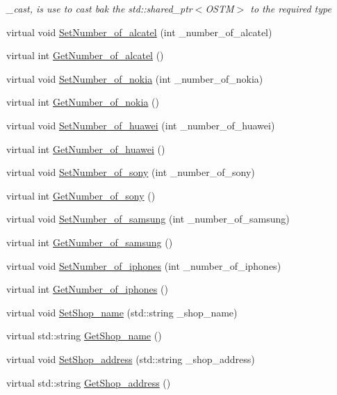 \begin{DoxyCompactItemize}
\begin{DoxyCompactList}\small\item\em \+\_\+cast, is use to cast bak the std\+::shared\+\_\+ptr$<$\+O\+S\+T\+M$>$ to the required type \end{DoxyCompactList}\item 
virtual void \hyperlink{class_s_l_i_g_o___w_abbd14fe78b2f5881020630842194aa5b}{Set\+Number\+\_\+of\+\_\+alcatel} (int \+\_\+number\+\_\+of\+\_\+alcatel)
\item 
virtual int \hyperlink{class_s_l_i_g_o___w_a5afed1018d0629a1e08fc266d05a94d9}{Get\+Number\+\_\+of\+\_\+alcatel} ()
\item 
virtual void \hyperlink{class_s_l_i_g_o___w_a2b748e4d815e0f2bdb8fb1b0e85b2636}{Set\+Number\+\_\+of\+\_\+nokia} (int \+\_\+number\+\_\+of\+\_\+nokia)
\item 
virtual int \hyperlink{class_s_l_i_g_o___w_a1aa9c9f001b37f3fdcdffae009319298}{Get\+Number\+\_\+of\+\_\+nokia} ()
\item 
virtual void \hyperlink{class_s_l_i_g_o___w_a3f770536e7ae43cba203b36b452bca76}{Set\+Number\+\_\+of\+\_\+huawei} (int \+\_\+number\+\_\+of\+\_\+huawei)
\item 
virtual int \hyperlink{class_s_l_i_g_o___w_a5804f623f4eb290df4f6b3aba59230d6}{Get\+Number\+\_\+of\+\_\+huawei} ()
\item 
virtual void \hyperlink{class_s_l_i_g_o___w_abbfe7001333b8c0b57a22f09ec4c3c1d}{Set\+Number\+\_\+of\+\_\+sony} (int \+\_\+number\+\_\+of\+\_\+sony)
\item 
virtual int \hyperlink{class_s_l_i_g_o___w_a62822c4fb80f739bee61767238a29e14}{Get\+Number\+\_\+of\+\_\+sony} ()
\item 
virtual void \hyperlink{class_s_l_i_g_o___w_ace5a2d4fae4c84710a648062e60022d2}{Set\+Number\+\_\+of\+\_\+samsung} (int \+\_\+number\+\_\+of\+\_\+samsung)
\item 
virtual int \hyperlink{class_s_l_i_g_o___w_aa4b6200a00c2a14924b7ff1ae3896b61}{Get\+Number\+\_\+of\+\_\+samsung} ()
\item 
virtual void \hyperlink{class_s_l_i_g_o___w_ad2f09386c9305c63a94ab171861eb3a9}{Set\+Number\+\_\+of\+\_\+iphones} (int \+\_\+number\+\_\+of\+\_\+iphones)
\item 
virtual int \hyperlink{class_s_l_i_g_o___w_a780b3a690f5cbbf7593ffc6612b3d743}{Get\+Number\+\_\+of\+\_\+iphones} ()
\item 
virtual void \hyperlink{class_s_l_i_g_o___w_ad2a9668f07e63bed2bb5da576cbb55b7}{Set\+Shop\+\_\+name} (std\+::string \+\_\+shop\+\_\+name)
\item 
virtual std\+::string \hyperlink{class_s_l_i_g_o___w_ae788518e30d9d311eb28f37da932367a}{Get\+Shop\+\_\+name} ()
\item 
virtual void \hyperlink{class_s_l_i_g_o___w_af442340c69e1f50622014d459320f003}{Set\+Shop\+\_\+address} (std\+::string \+\_\+shop\+\_\+address)
\item 
virtual std\+::string \hyperlink{class_s_l_i_g_o___w_a66a2315d531231e34c5056e9bc917797}{Get\+Shop\+\_\+address} ()
\end{DoxyCompactItemize}


